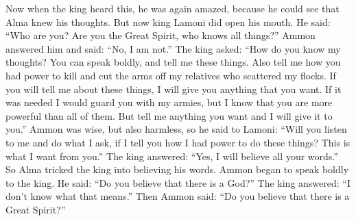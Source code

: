Now when the king heard this, he was again amazed, because he could see that Alma knew his thoughts. But now king Lamoni did open his mouth. He said: ``Who are you? Are you the Great Spirit, who knows all things?''
\bverse \iffalse Ammon answered and said unto him: I am not. \fi
Ammon answered him and said: ``No, I am not.''
\bverse \iffalse And the king said: How knowest thou the thoughts of my heart?  Thou mayest speak boldly, and tell me concerning these things; and also tell me by what power ye slew and smote off the arms of my brethren that scattered my flocks-- \fi
The king asked: ``How do you know my thoughts? You can speak boldly, and tell me these things. Also tell me how you had power to kill and cut the arms off my relatives who scattered my flocks.
\bverse \iffalse And now, if thou wilt tell me concerning these things, whatsoever thou desirest I will give unto thee; and if it were needed, I would guard thee with my armies; but I know that thou art more powerful than all they; nevertheless, whatsoever thou desirest of me I will grant it unto thee. \fi
If you will tell me about these things, I will give you anything that you want. If it was needed I would guard you with my armies, but I know that you are more powerful than all of them. But tell me anything you want and I will give it to you.''
\bverse \iffalse Now Ammon being wise, yet harmless, he said unto Lamoni: Wilt thou hearken unto my words, if I tell thee by what power I do these things? And this is the thing that I desire of thee. \fi
Ammon was wise, but also harmless, so he said to Lamoni: ``Will you listen to me and do what I ask, if I tell you how I had power to do these things? This is what I want from you.''
\bverse \iffalse And the king answered him, and said: Yea, I will believe all thy words. And thus he was caught with guile. \fi
The king answered: ``Yes, I will believe all your words.'' So Alma tricked the king into believing his words.
\bverse \iffalse And Ammon began to speak unto him with boldness, and said unto him: Believest thou that there is a God? \fi
Ammon began to speak boldly to the king. He said: ``Do you believe that there is a God?''
\bverse \iffalse And he answered, and said unto him: I do not know what that meaneth. \fi
The king answered: ``I don't know what that means.''
\bverse \iffalse And then Ammon said: Believest thou that there is a Great Spirit? \fi
Then Ammon said: ``Do you believe that there is a Great Spirit?''
\bverse \iffalse And he said, Yea. \fi
